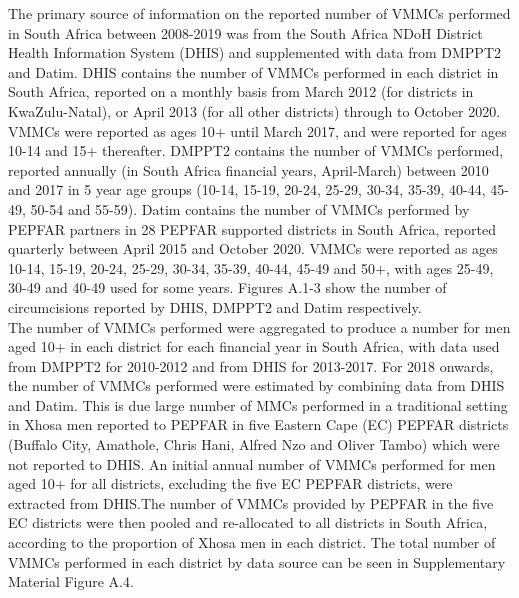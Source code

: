\documentclass{article}
\begin{document}
\begin{appendix}
\noindent The primary source of information on the reported number of VMMCs performed in South Africa between 2008-2019 was from the South Africa NDoH District Health Information System (DHIS) and supplemented with data from DMPPT2 and Datim. DHIS contains the number of VMMCs performed in each district in South Africa, reported on a monthly basis from March 2012 (for districts in KwaZulu-Natal), or April 2013 (for all other districts) through to October 2020. VMMCs were reported as ages 10+ until March 2017, and were reported for ages 10-14 and 15+ thereafter. DMPPT2 contains the number of VMMCs performed, reported annually (in South Africa financial years, April-March) between 2010 and 2017 in 5 year age groups (10-14, 15-19, 20-24, 25-29, 30-34, 35-39, 40-44, 45-49, 50-54 and 55-59). Datim contains the number of VMMCs performed by PEPFAR partners in 28 PEPFAR supported districts in South Africa, reported quarterly between April 2015 and October 2020. VMMCs were reported as ages 10-14, 15-19, 20-24, 25-29, 30-34, 35-39, 40-44, 45-49 and 50+, with ages 25-49, 30-49 and 40-49 used for some years. Figures A.1-3 show the number of circumcisions reported by DHIS, DMPPT2 and Datim respectively.  \\

\noindent The number of VMMCs performed were aggregated to produce a number for men aged 10+ in each district for each financial year in South Africa, with data used from DMPPT2 for 2010-2012 and from DHIS for 2013-2017. For 2018 onwards, the number of VMMCs performed were estimated by combining data from DHIS and Datim. This is due large number of MMCs performed in a traditional setting in Xhosa men reported to PEPFAR in five Eastern Cape (EC) PEPFAR districts (Buffalo City, Amathole, Chris Hani, Alfred Nzo and Oliver Tambo) which were not reported to DHIS. An initial annual number of VMMCs performed for men aged 10+ for all districts, excluding the five EC PEPFAR districts, were extracted from DHIS.The number of VMMCs provided by PEPFAR in the five EC districts were then pooled and re-allocated to all districts in South Africa, according to the proportion of Xhosa men in each district. The total number of VMMCs performed in each district by data source can be seen in Supplementary Material Figure A.4.  \\




\end{appendix}
\end{document}
